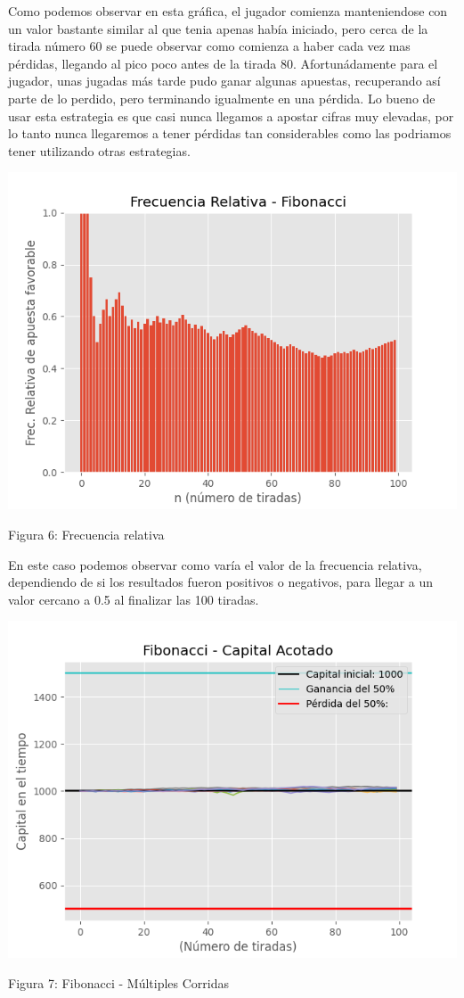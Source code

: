\documentclass{article}
\begin{document}
Como podemos observar en esta gráfica, el jugador comienza manteniendose con un valor bastante similar al que tenia apenas había iniciado, pero cerca de la tirada número 60 se puede observar como comienza a haber cada vez mas pérdidas, llegando al pico poco antes de la tirada 80. Afortunádamente para el jugador, unas jugadas más tarde pudo ganar algunas apuestas, recuperando así parte de lo perdido, pero terminando igualmente en una pérdida. Lo bueno de usar esta estrategia es que casi nunca llegamos a apostar cifras muy elevadas, por lo tanto nunca llegaremos a tener pérdidas tan considerables como las podriamos tener utilizando otras estrategias.

\begin{center}
    \includegraphics[width=0.7\linewidth]{FreRel-FIB.png}
    
    \caption{Figura 6: Frecuencia relativa}
\end{center}

En este caso podemos observar como varía el valor de la frecuencia relativa, dependiendo de si los resultados fueron positivos o negativos, para llegar a un valor cercano a 0.5 al finalizar las 100 tiradas.

\begin{center}
    \includegraphics[width=0.7\linewidth]{FIB-acotado-multiplestiradas(1).png}
    
    \caption{Figura 7: Fibonacci - Múltiples Corridas}
\end{center}
\end{document}
